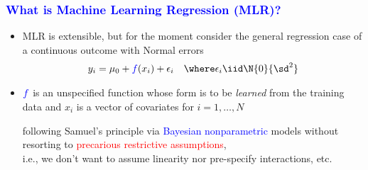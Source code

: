 \documentclass[11pt,dvipsnames,usenames,times]{beamer}
\begin{document}
\begin{frame}[fragile]
\frametitle{\bf\textcolor{blue}{What is Machine Learning Regression (MLR)?}}
\boldmath

\begin{itemize}
\item MLR is extensible, but for the moment consider the general
  regression case of a continuous outcome with Normal errors
\begin{align*}
y_i & = \mu_0 + \textcolor{blue}{f}(x_i) + \epsilon_i 
& \where \epsilon_i \iid \N{0}{\textcolor{black}{\sd^2}}
\end{align*}
\item %
$\textcolor{blue}{f}$ is an
  unspecified %
  function whose form is to be {\it learned} from the training data and $x_i$
  is a vector of covariates for $i=1, \dots, N$
\begin{comment}
\item An important modern MLR extension that we will only touch on
\begin{align*}
y_i & = \mu_0 + \textcolor{blue}{f}(x_i) + \textcolor{red}{s}(x_i)\epsilon_i 
& \where \epsilon_i \iid F_{\epsilon}
\end{align*}
\item $\textcolor{blue}{f}$ alone (or $\textcolor{blue}{f}$ and
  $\textcolor{red}{s}$) will be {\it learned}, but how?
\end{comment}
following Samuel's principle via 
\textcolor{blue}{Bayesian nonparametric} models
without resorting to \textcolor{red}{precarious restrictive assumptions},\\ i.e.,
we don't want to assume linearity nor pre-specify interactions, etc.
\end{itemize}
\end{frame}
\end{document}
